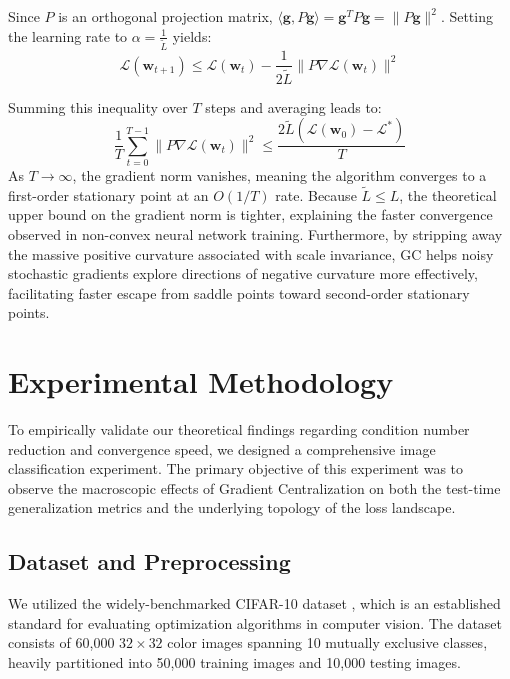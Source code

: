 \documentclass[conference]{IEEEtran}
\begin{document}
Since $P$ is an orthogonal projection matrix, $\langle \mathbf{g}, P \mathbf{g} \rangle = \mathbf{g}^T P \mathbf{g} = \| P \mathbf{g} \|^2$. Setting the learning rate to $\alpha = \frac{1}{\tilde{L}}$ yields:
\begin{equation}
\mathcal{L}(\mathbf{w}_{t+1}) \le \mathcal{L}(\mathbf{w}_t) - \frac{1}{2\tilde{L}} \| P \nabla \mathcal{L}(\mathbf{w}_t) \|^2
\end{equation}

Summing this inequality over $T$ steps and averaging leads to:
\begin{equation}
\frac{1}{T} \sum_{t=0}^{T-1} \| P \nabla \mathcal{L}(\mathbf{w}_t) \|^2 \le \frac{2\tilde{L} (\mathcal{L}(\mathbf{w}_0) - \mathcal{L}^*)}{T}
\end{equation}
As $T \to \infty$, the gradient norm vanishes, meaning the algorithm converges to a first-order stationary point at an $O(1/T)$ rate. Because $\tilde{L} \le L$, the theoretical upper bound on the gradient norm is tighter, explaining the faster convergence observed in non-convex neural network training. Furthermore, by stripping away the massive positive curvature associated with scale invariance, GC helps noisy stochastic gradients explore directions of negative curvature more effectively, facilitating faster escape from saddle points toward second-order stationary points.

\section{Experimental Methodology}
To empirically validate our theoretical findings regarding condition number reduction and convergence speed, we designed a comprehensive image classification experiment. The primary objective of this experiment was to observe the macroscopic effects of Gradient Centralization on both the test-time generalization metrics and the underlying topology of the loss landscape.

\subsection{Dataset and Preprocessing}
We utilized the widely-benchmarked CIFAR-10 dataset \cite{krizhevsky2009learning}, which is an established standard for evaluating optimization algorithms in computer vision. The dataset consists of 60,000 $32 \times 32$ color images spanning 10 mutually exclusive classes, heavily partitioned into 50,000 training images and 10,000 testing images. 
\end{document}
